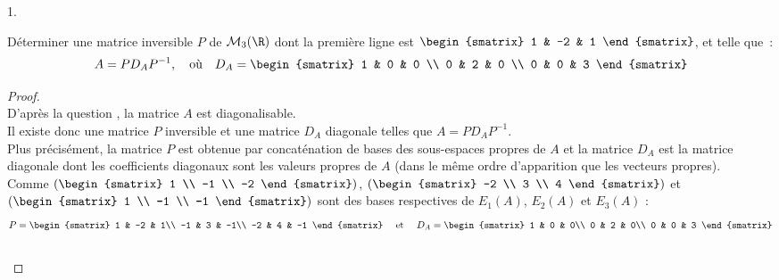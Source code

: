 \documentclass[11pt]{article}%
\begin{document}
\begin{noliste}{1.}
\item Déterminer une matrice inversible $P$ de $\mathcal{M}_3(\R)$
  dont la première ligne est $\begin{smatrix} 1 & -2 & 1
  \end{smatrix}$, et telle que~:
  \[ 
  A = P D_A P^{-1}, \quad \text{où} \quad D_A = 
  \begin{smatrix} 
    1 & 0 & 0 \\ 
    0 & 2 & 0 \\ 
    0 & 0 & 3 
  \end{smatrix} 
  \]
  
  \begin{proof}~\\
    D'après la question , la matrice $A$ est diagonalisable.\\
    Il existe donc une matrice $P$ inversible et une matrice $D_A$
    diagonale telles que $A = PD_AP^{-1}$.\\
    Plus précisément, la matrice $P$ est obtenue par concaténation de
    bases des sous-espaces propres de $A$ et la matrice $D_A$ est la
    matrice diagonale dont les coefficients diagonaux sont les valeurs
    propres de $A$ (dans le même ordre d'apparition que les vecteurs
    propres).\\
    Comme $\left(
      \begin{smatrix}
        1 \\
        -1 \\
        -2
      \end{smatrix}
    \right)$, $\left(
      \begin{smatrix}
        -2 \\
        3 \\
        4
      \end{smatrix}
    \right)$ et $\left(
      \begin{smatrix}
        1 \\
        -1 \\
        -1
      \end{smatrix}
    \right)$ sont des bases respectives de $E_1(A)$, $E_2(A)$ et
    $E_3(A)$ :
    \[
    P=
    \begin{smatrix}
      1 & -2 & 1\\
      -1 & 3 & -1\\
      -2 & 4 & -1
    \end{smatrix}
    \quad \text{ et } \quad %
    D_A=
    \begin{smatrix}
      1 & 0 & 0\\
      0 & 2 & 0\\
      0 & 0 & 3
    \end{smatrix}
    \]
    ~\\[-1cm]
  \end{proof}



\end{noliste}
\end{document}
